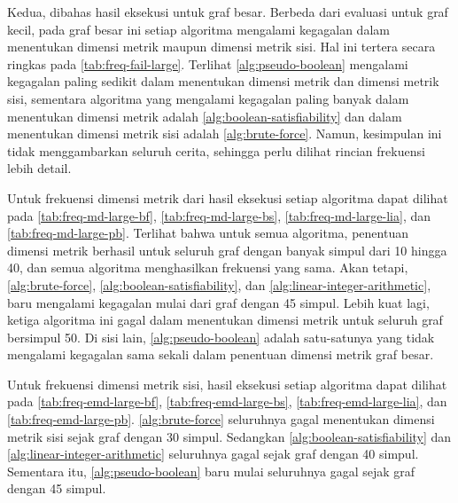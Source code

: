 \begin{landscape}
\begin{center}
	\renewcommand{\minipagewidth}{0.475\linewidth}

	\vphantom{}
	\vfill

	
	\hspace{2em}
	

	\vspace{2em}

	
	\hspace{2em}
	

	\vfill \vfill \vfill
\end{center}
\end{landscape}

Kedua, dibahas hasil eksekusi untuk graf besar. Berbeda dari evaluasi untuk graf kecil, pada graf besar ini setiap algoritma mengalami kegagalan dalam menentukan dimensi metrik maupun dimensi metrik sisi. Hal ini tertera secara ringkas pada \autoref{tab:freq-fail-large}. Terlihat \autoref{alg:pseudo-boolean} mengalami kegagalan paling sedikit dalam menentukan dimensi metrik dan dimensi metrik sisi, sementara algoritma yang mengalami kegagalan paling banyak dalam menentukan dimensi metrik adalah \autoref{alg:boolean-satisfiability} dan dalam menentukan dimensi metrik sisi adalah \autoref{alg:brute-force}. Namun, kesimpulan ini tidak menggambarkan seluruh cerita, sehingga perlu dilihat rincian frekuensi lebih detail.

Untuk frekuensi dimensi metrik dari hasil eksekusi setiap algoritma dapat dilihat pada \autoref{tab:freq-md-large-bf}, \autoref{tab:freq-md-large-bs}, \autoref{tab:freq-md-large-lia}, dan \autoref{tab:freq-md-large-pb}. Terlihat bahwa untuk semua algoritma, penentuan dimensi metrik berhasil untuk seluruh graf dengan banyak simpul dari 10 hingga 40, dan semua algoritma menghasilkan frekuensi yang sama. Akan tetapi, \autoref{alg:brute-force}, \autoref{alg:boolean-satisfiability}, dan \autoref{alg:linear-integer-arithmetic}, baru mengalami kegagalan mulai dari graf dengan 45 simpul. Lebih kuat lagi, ketiga algoritma ini gagal dalam menentukan dimensi metrik untuk seluruh graf bersimpul 50. Di sisi lain, \autoref{alg:pseudo-boolean} adalah satu-satunya yang tidak mengalami kegagalan sama sekali dalam penentuan dimensi metrik graf besar.

Untuk frekuensi dimensi metrik sisi, hasil eksekusi setiap algoritma dapat dilihat pada \autoref{tab:freq-emd-large-bf}, \autoref{tab:freq-emd-large-bs}, \autoref{tab:freq-emd-large-lia}, dan \autoref{tab:freq-emd-large-pb}. \autoref{alg:brute-force} seluruhnya gagal menentukan dimensi metrik sisi sejak graf dengan 30 simpul. Sedangkan \autoref{alg:boolean-satisfiability} dan \autoref{alg:linear-integer-arithmetic} seluruhnya gagal sejak graf dengan 40 simpul. Sementara itu, \autoref{alg:pseudo-boolean} baru mulai seluruhnya gagal sejak graf dengan 45 simpul.


